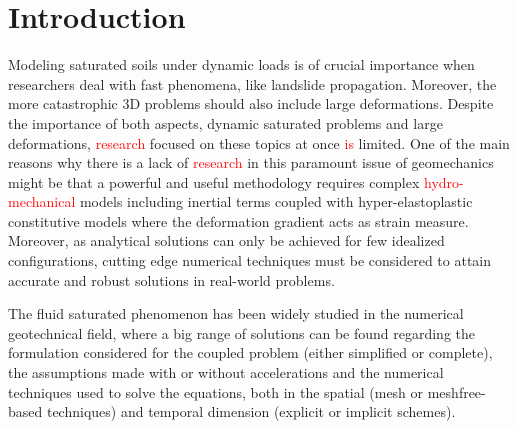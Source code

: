 \documentclass[twocolumn]{svjour3}          %
\begin{document}
\section{Introduction}
\label{intro}

Modeling saturated soils under dynamic loads is of crucial importance when researchers deal with fast phenomena, like landslide propagation. Moreover, the more catastrophic 3D problems should also include large deformations. Despite the importance of both aspects, dynamic saturated problems and large deformations, \textcolor{red}{research} focused on these topics at once \textcolor{red}{is} limited. One of the main reasons why there is a lack of \textcolor{red}{research} in this paramount issue of geomechanics might be that a powerful and useful methodology requires complex \textcolor{red}{hydro-mechanical} models including inertial terms coupled with hyper-elastoplastic constitutive models where the deformation gradient acts as strain measure. Moreover, as analytical solutions can only be achieved for few idealized configurations, cutting edge numerical techniques must be considered to attain accurate and robust solutions in real-world problems.

The fluid saturated phenomenon has been widely studied in the numerical geotechnical field, where a big range of solutions can be found regarding the formulation considered for the coupled problem (either simplified or complete), the assumptions made with or without accelerations and the numerical techniques used to solve the equations, both in the spatial (mesh or meshfree-based techniques) and temporal dimension (explicit or implicit schemes). 
\end{document}
